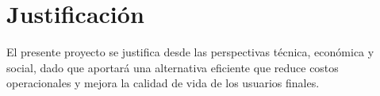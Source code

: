 \section{Justificación}
\label{sec:justificacion}
El presente proyecto se justifica desde las perspectivas técnica, económica y social, dado que aportará una alternativa eficiente que reduce costos operacionales y mejora la calidad de vida de los usuarios finales.
